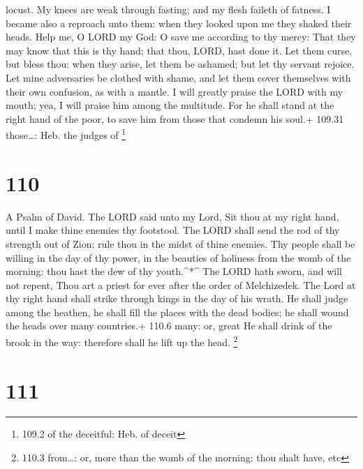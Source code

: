 locust.  My knees are weak through fasting; and my flesh
faileth of fatness.  I became also a reproach unto them:
when they looked upon me they shaked their heads.  Help me,
O LORD my God: O save me according to thy mercy:  That they
may know that this is thy hand; that thou, LORD, hast done it.
 Let them curse, but bless thou: when they arise, let them
be ashamed; but let thy servant rejoice.  Let mine
adversaries be clothed with shame, and let them cover themselves with
their own confusion, as with a mantle.  I will greatly
praise the LORD with my mouth; yea, I will praise him among the
multitude.  For he shall stand at the right hand of the
poor, to save him from those that condemn his soul.+ 109.31 those\ldots:
Heb. the judges of \footnote{109.2 of the deceitful: Heb. of deceit}

\hypertarget{section-109}{%
\section{110}\label{section-109}}

A Psalm of David.  The LORD said unto my Lord, Sit thou at
my right hand, until I make thine enemies thy footstool. 
The LORD shall send the rod of thy strength out of Zion: rule thou in
the midst of thine enemies.  Thy people shall be willing in
the day of thy power, in the beauties of holiness from the womb of the
morning: thou hast the dew of thy youth.\^{}*\^{}  The LORD
hath sworn, and will not repent, Thou art a priest for ever after the
order of Melchizedek.  The Lord at thy right hand shall
strike through kings in the day of his wrath.  He shall
judge among the heathen, he shall fill the places with the dead bodies;
he shall wound the heads over many countries.+ 110.6 many: or, great
 He shall drink of the brook in the way: therefore shall he
lift up the head. \footnote{110.3 from\ldots: or, more than the womb of
  the morning: thou shalt have, etc}

\hypertarget{section-110}{%
\section{111}\label{section-110}}

